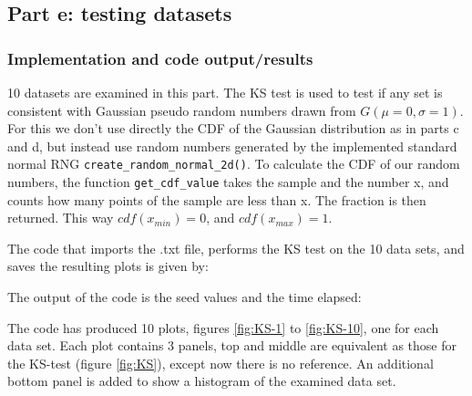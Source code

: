 \documentclass{article}
\begin{document}
\subsection{Part e: testing datasets}
\subsubsection{Implementation and code output/results}
10 datasets are examined in this part. The KS test is used to test if any set is consistent with Gaussian pseudo random numbers drawn from $G(\mu=0, \sigma=1)$. For this we don't use directly the CDF of the Gaussian distribution as in parts c and d, but instead use random numbers generated by the implemented standard normal RNG \verb+create_random_normal_2d()+.  To calculate the CDF of our random numbers, the function \verb+get_cdf_value+ takes the sample and the number x, and counts how many points of the sample are less than x. The fraction is then returned. This way $cdf(x_{min})=0$, and $cdf(x_{max})=1$. 

The code that imports the .txt file, performs the KS test on the 10 data sets, and saves the resulting plots is given by:


The output of the code is the seed values and the time elapsed:


The code has produced 10 plots, figures \ref{fig:KS-1} to \ref{fig:KS-10}, one for each data set. Each plot contains 3 panels, top and middle are equivalent as those for the KS-test (figure \ref{fig:KS}), except now there is no reference. An additional bottom panel is added to show a histogram of the examined data set.
\end{document}
